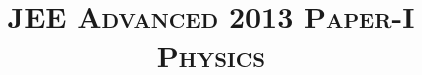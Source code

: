 \documentclass{article}
\title{\textsc{JEE Advanced 2013 Paper-I\\Physics}}
\date{}
\begin{document}
\maketitle
\begin{enumerate}
    
    
    
    
    
    
    
    
    
    
    
    
    
    
    
    
    
    
    
    
\end{enumerate}
\end{document}
